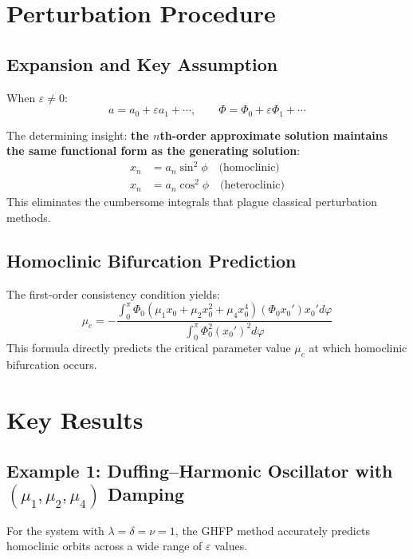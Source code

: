 \documentclass[11pt,a4paper]{article}
\begin{document}
\section{Perturbation Procedure}

\subsection{Expansion and Key Assumption}

When $\varepsilon \neq 0$:
\begin{equation}
a = a_0 + \varepsilon a_1 + \cdots, \qquad \Phi = \Phi_0 + \varepsilon\Phi_1 + \cdots
\label{eq:expansion}
\end{equation}

The determining insight: \textbf{the $n$th-order approximate solution maintains the same functional form as the generating solution}:
\begin{align}
x_n &= a_n \sin^2\phi \quad \text{(homoclinic)}\\
x_n &= a_n \cos^2\phi \quad \text{(heteroclinic)}
\end{align}
This eliminates the cumbersome integrals that plague classical perturbation methods.

\subsection{Homoclinic Bifurcation Prediction}

The first-order consistency condition yields:
\begin{equation}
\boxed{\mu_c = -\frac{\int_0^\pi \Phi_0 (\mu_1 x_0 + \mu_2 x_0^2 + \mu_4 x_0^4)(\Phi_0 x_0') x_0' d\varphi}{\int_0^\pi \Phi_0^2 (x_0')^2 d\varphi}}
\label{eq:mu_c}
\end{equation}
This formula directly predicts the critical parameter value $\mu_c$ at which homoclinic bifurcation occurs.

\section{Key Results}

\subsection{Example 1: Duffing--Harmonic Oscillator with $(\mu_1, \mu_2, \mu_4)$ Damping}

For the system with $\lambda = \delta = \nu = 1$, the GHFP method accurately predicts homoclinic orbits across a wide range of $\varepsilon$ values.
\end{document}
